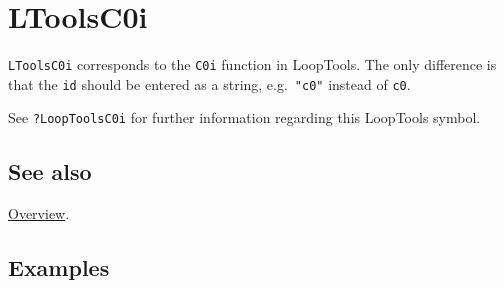 \documentclass[../FeynHelpersManual.tex]{subfiles}
\begin{document}
\hypertarget{ltoolsc0i}{
\section{LToolsC0i}\label{ltoolsc0i}}

\texttt{LToolsC0i} corresponds to the \texttt{C0i} function in
LoopTools. The only difference is that the \texttt{id} should be entered
as a string, e.g.~\texttt{"c0"} instead of \texttt{c0}.

See \texttt{?LoopTools\textasciigrave C0i} for further information
regarding this LoopTools symbol.

\subsection{See also}

\hyperlink{toc}{Overview}.

\subsection{Examples}
\end{document}
